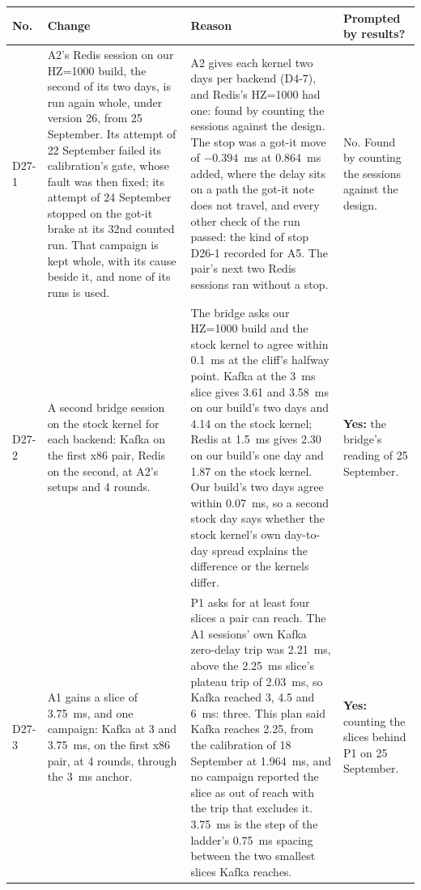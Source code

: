 \documentclass[11pt]{article}
\begin{document}
{\small
\begin{longtable}{@{}p{1.1cm} >{\raggedright\arraybackslash}p{6.1cm} >{\raggedright\arraybackslash}p{6.0cm} >{\raggedright\arraybackslash}p{2.2cm}@{}}
\toprule
\textbf{No.} & \textbf{Change} & \textbf{Reason} & \textbf{Prompted by results?} \\
\midrule
\endhead
D27-1 & A2's Redis session on our HZ=1000 build, the second of its two days, is run again whole, under version 26, from 25 September. Its attempt of 22 September failed its calibration's gate, whose fault was then fixed; its attempt of 24 September stopped on the got-it brake at its 32nd counted run. That campaign is kept whole, with its cause beside it, and none of its runs is used. & A2 gives each kernel two days per backend (D4-7), and Redis's HZ=1000 had one: found by counting the sessions against the design. The stop was a got-it move of $-0.394$~ms at 0.864~ms added, where the delay sits on a path the got-it note does not travel, and every other check of the run passed: the kind of stop D26-1 recorded for A5. The pair's next two Redis sessions ran without a stop. & No. Found by counting the sessions against the design. \\
D27-2 & A second bridge session on the stock kernel for each backend: Kafka on the first x86 pair, Redis on the second, at A2's setups and 4 rounds. & The bridge asks our HZ=1000 build and the stock kernel to agree within 0.1~ms at the cliff's halfway point. Kafka at the 3~ms slice gives 3.61 and 3.58~ms on our build's two days and 4.14 on the stock kernel; Redis at 1.5~ms gives 2.30 on our build's one day and 1.87 on the stock kernel. Our build's two days agree within 0.07~ms, so a second stock day says whether the stock kernel's own day-to-day spread explains the difference or the kernels differ. & \textbf{Yes:} the bridge's reading of 25 September. \\
D27-3 & A1 gains a slice of 3.75~ms, and one campaign: Kafka at 3 and 3.75~ms, on the first x86 pair, at 4 rounds, through the 3~ms anchor. & P1 asks for at least four slices a pair can reach. The A1 sessions' own Kafka zero-delay trip was 2.21~ms, above the 2.25~ms slice's plateau trip of 2.03~ms, so Kafka reached 3, 4.5 and 6~ms: three. This plan said Kafka reaches 2.25, from the calibration of 18 September at 1.964~ms, and no campaign reported the slice as out of reach with the trip that excludes it. 3.75~ms is the step of the ladder's 0.75~ms spacing between the two smallest slices Kafka reaches. & \textbf{Yes:} counting the slices behind P1 on 25 September. \\

\end{longtable}}
\end{document}
